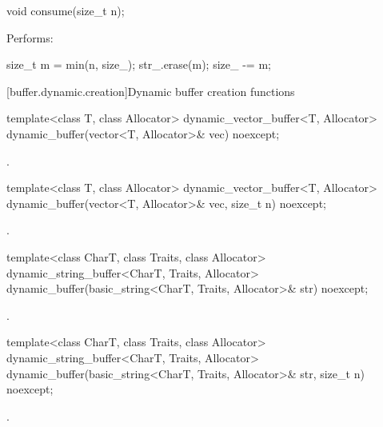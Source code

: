 \begin{itemdecl}
void consume(size_t n);
\end{itemdecl}

\begin{itemdescr}
\pnum
\effects Performs:
\begin{codeblock}
size_t m = min(n, size_);
str_.erase(m);
size_ -= m;
\end{codeblock}

\end{itemdescr}



[buffer.dynamic.creation]{Dynamic buffer creation functions}

\begin{itemdecl}
template<class T, class Allocator>
  dynamic_vector_buffer<T, Allocator>
    dynamic_buffer(vector<T, Allocator>& vec) noexcept;
\end{itemdecl}

\begin{itemdescr}
\pnum
\returns {}.
\end{itemdescr}

\begin{itemdecl}
template<class T, class Allocator>
  dynamic_vector_buffer<T, Allocator>
    dynamic_buffer(vector<T, Allocator>& vec, size_t n) noexcept;
\end{itemdecl}

\begin{itemdescr}
\pnum
\returns {}.
\end{itemdescr}

\begin{itemdecl}
template<class CharT, class Traits, class Allocator>
  dynamic_string_buffer<CharT, Traits, Allocator>
    dynamic_buffer(basic_string<CharT, Traits, Allocator>& str) noexcept;
\end{itemdecl}

\begin{itemdescr}
\pnum
\returns {}.
\end{itemdescr}

\begin{itemdecl}
template<class CharT, class Traits, class Allocator>
  dynamic_string_buffer<CharT, Traits, Allocator>
    dynamic_buffer(basic_string<CharT, Traits, Allocator>& str, size_t n) noexcept;
\end{itemdecl}

\begin{itemdescr}
\pnum
\returns {}.
\end{itemdescr}



